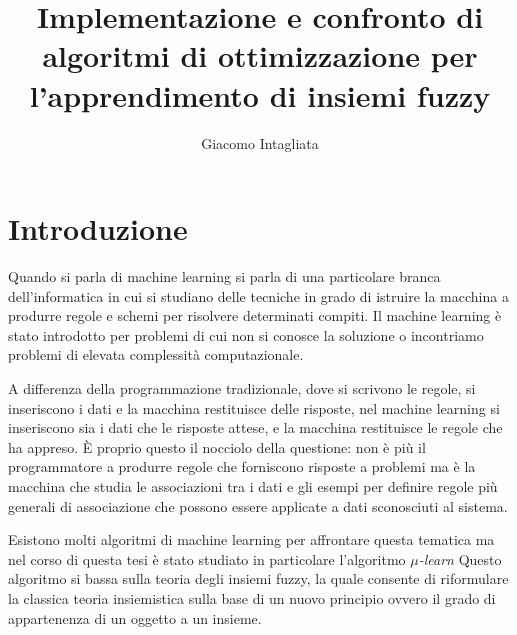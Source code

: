 \documentclass[a4paper,12pt]{report}
\begin{document}
\title{Implementazione e confronto di algoritmi di ottimizzazione per l'apprendimento di insiemi fuzzy}
\author{Giacomo Intagliata}
%
% 
%
\beforepreface

%
%
\afterpreface

%
\chapter*{Introduzione}
\label{Introduzione}

Quando si parla di machine learning si parla di una particolare branca dell'informatica in cui si studiano delle tecniche in grado di istruire la macchina a produrre regole e schemi per risolvere determinati compiti. Il machine learning è stato introdotto per problemi di cui non si conosce la soluzione o incontriamo problemi di elevata complessità computazionale.

A differenza della programmazione tradizionale, dove si scrivono le regole, si inseriscono i dati e la macchina restituisce delle risposte, nel machine learning si inseriscono sia i dati che le risposte attese, e la macchina restituisce le regole che ha appreso. \`E proprio questo il nocciolo della questione: non è più il programmatore a produrre regole che forniscono risposte a problemi ma è la macchina che studia le associazioni tra i dati e gli esempi per definire regole più generali di associazione che possono essere applicate a dati sconosciuti al sistema.

Esistono molti algoritmi di machine learning per affrontare questa tematica ma nel corso di questa tesi è stato studiato in particolare l'algoritmo \textit{$\mu$-learn} Questo algoritmo si bassa sulla teoria degli insiemi fuzzy, la quale consente di riformulare la classica teoria insiemistica sulla base di un nuovo principio ovvero il grado di appartenenza di un oggetto a un insieme. 
\end{document}
